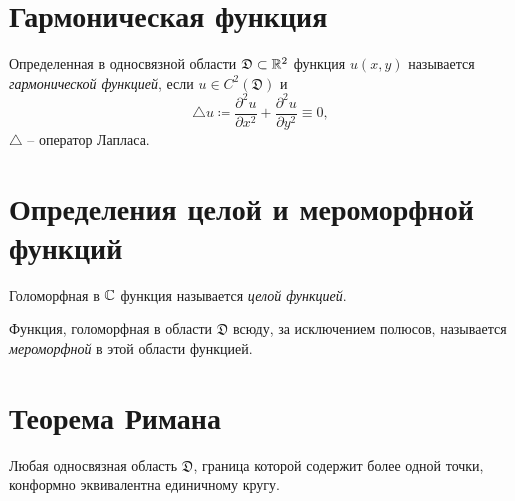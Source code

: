 \section{Гармоническая функция}

\begin{definition}
	Определенная в односвязной области $\mathfrak{D}\subset \mathbb{R}^2$ функция $u(x,y)$ называется \emph{гармонической функцией}, если $u \in C^2(\mathfrak{D})$ и
	\[
		\triangle u \coloneq \frac{\partial^2 u}{\partial x^2} + \frac{\partial^2 u}{\partial y^2} \equiv 0,
	\]
	$\triangle$ -- оператор Лапласа.
\end{definition}

\section{Определения целой и мероморфной функций}

\begin{definition}
	Голоморфная в $\mathbb{C}$ функция называется \emph{целой функцией}.
\end{definition}

\begin{definition}
	Функция, голоморфная в области $\mathfrak{D}$ всюду, за исключением полюсов, называется \emph{мероморфной} в этой области функцией.
\end{definition}

\section{Теорема Римана}

\begin{theorem}
	Любая односвязная область $\mathfrak{D}$, граница которой содержит более одной точки, конформно эквивалентна единичному кругу.
\end{theorem}
